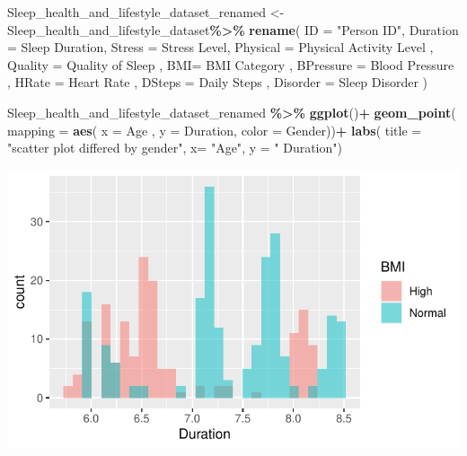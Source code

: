 \documentclass[
  11pt,
]{article}
\newenvironment{Shaded}{\begin{snugshade}}{\end{snugshade}}
\newcommand{\AttributeTok}[1]{\textcolor[rgb]{0.13,0.29,0.53}{#1}}
\newcommand{\FunctionTok}[1]{\textcolor[rgb]{0.13,0.29,0.53}{\textbf{#1}}}
\newcommand{\NormalTok}[1]{#1}
\newcommand{\OtherTok}[1]{\textcolor[rgb]{0.56,0.35,0.01}{#1}}
\newcommand{\SpecialCharTok}[1]{\textcolor[rgb]{0.81,0.36,0.00}{\textbf{#1}}}
\newcommand{\StringTok}[1]{\textcolor[rgb]{0.31,0.60,0.02}{#1}}
\begin{document}
\begin{Shaded}
\begin{Highlighting}[]
\NormalTok{Sleep\_health\_and\_lifestyle\_dataset\_renamed }\OtherTok{\textless{}{-}}\NormalTok{ Sleep\_health\_and\_lifestyle\_dataset}\SpecialCharTok{\%\textgreater{}\%}
  \FunctionTok{rename}\NormalTok{( }\AttributeTok{ID =} \StringTok{"Person ID"}\NormalTok{,}
          \AttributeTok{Duration =} \StringTok{\textquotesingle{}Sleep Duration\textquotesingle{}}\NormalTok{,}
          \AttributeTok{Stress =} \StringTok{\textquotesingle{}Stress Level\textquotesingle{}}\NormalTok{,}
          \AttributeTok{Physical =} \StringTok{\textquotesingle{}Physical Activity Level\textquotesingle{}}\NormalTok{ ,}
          \AttributeTok{Quality =} \StringTok{\textquotesingle{}Quality of Sleep\textquotesingle{}}\NormalTok{ ,}
          \AttributeTok{BMI=} \StringTok{\textquotesingle{}BMI Category\textquotesingle{}}\NormalTok{ ,}
          \AttributeTok{BPressure =} \StringTok{\textquotesingle{}Blood Pressure\textquotesingle{}}\NormalTok{ ,}
          \AttributeTok{HRate =} \StringTok{\textquotesingle{}Heart Rate\textquotesingle{}}\NormalTok{ ,}
          \AttributeTok{DSteps =} \StringTok{\textquotesingle{}Daily Steps\textquotesingle{}}\NormalTok{ ,}
          \AttributeTok{Disorder =} \StringTok{\textquotesingle{}Sleep Disorder\textquotesingle{}}\NormalTok{ )}
\end{Highlighting}
\end{Shaded}

\begin{Shaded}
\begin{Highlighting}[]
\NormalTok{Sleep\_health\_and\_lifestyle\_dataset\_renamed }\SpecialCharTok{\%\textgreater{}\%}
  \FunctionTok{ggplot}\NormalTok{()}\SpecialCharTok{+}
  \FunctionTok{geom\_point}\NormalTok{( }\AttributeTok{mapping =} \FunctionTok{aes}\NormalTok{( }\AttributeTok{x =}\NormalTok{ Age , }\AttributeTok{y =}\NormalTok{ Duration, }\AttributeTok{color =}\NormalTok{ Gender))}\SpecialCharTok{+}
  \FunctionTok{labs}\NormalTok{(}
   \AttributeTok{title =} \StringTok{"scatter plot differed by gender"}\NormalTok{,}
   \AttributeTok{x=} \StringTok{"Age"}\NormalTok{, }\AttributeTok{y =} \StringTok{" Duration"}\NormalTok{)}
\end{Highlighting}
\end{Shaded}

\begin{center}\includegraphics[width=0.7\linewidth]{SleepHelath_files/figure-latex/unnamed-chunk-5-1} \end{center}
\end{document}
